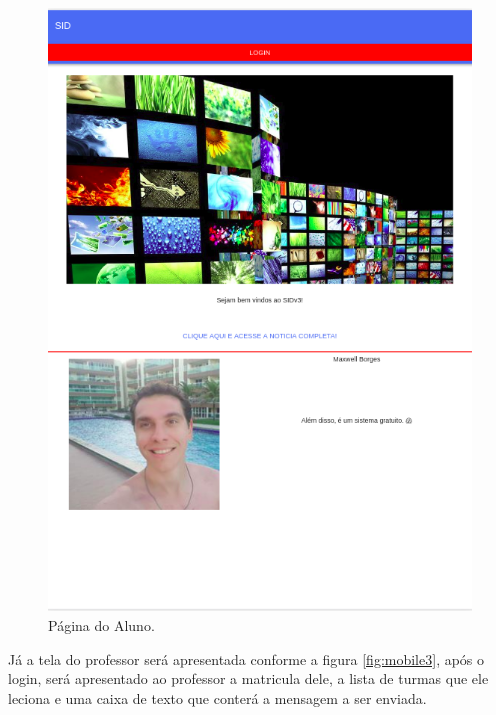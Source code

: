 \begin{figure}[H]
\centering
\includegraphics[scale=0.4]{figuras/mobile1}
\caption{Página do Aluno.}
\label{fig:mobile2}
\end{figure}

Já a tela do professor será apresentada conforme a figura \ref{fig:mobile3}, após o login, será apresentado ao professor a matricula dele, a lista de turmas que ele leciona e uma caixa de texto que conterá a mensagem a ser enviada. 

